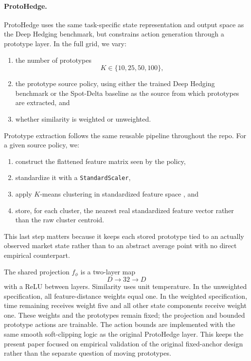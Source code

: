 \documentclass[sigconf]{acmart}
\begin{document}
\paragraph{ProtoHedge.}
ProtoHedge uses the same task-specific state representation and output space as
the Deep Hedging benchmark, but constrains action generation through a
prototype layer. In the full grid, we vary:
\begin{enumerate}
    \item the number of prototypes
    \[
    K \in \{10, 25, 50, 100\},
    \]
    \item the prototype source policy, using either the trained Deep Hedging
    benchmark or the Spot-Delta baseline as the source from which prototypes
    are extracted, and
    \item whether similarity is weighted or unweighted.
\end{enumerate}

Prototype extraction follows the same reusable pipeline throughout the repo. For a given source policy, we:
\begin{enumerate}
    \item construct the flattened feature matrix seen by the policy,
    \item standardize it with a \texttt{StandardScaler},
    \item apply $K$-means clustering in standardized feature space
    \cite{macqueen1967}, and
    \item store, for each cluster, the nearest real standardized feature vector rather than the raw cluster centroid.
\end{enumerate}
This last step matters because it keeps each stored prototype tied to an actually observed market state rather than to an abstract average point with no direct empirical counterpart.

The shared projection $f_\phi$ is a two-layer map
\[
D\longrightarrow 32\longrightarrow D
\]
with a ReLU between layers. Similarity uses unit temperature. In the
unweighted specification, all feature-distance weights equal one. In the
weighted specification, time remaining receives weight five and all other
state components receive weight one. These weights and the prototypes remain
fixed; the projection and bounded prototype actions are trainable. The action
bounds are implemented with the same smooth soft-clipping logic as the
original ProtoHedge layer. This keeps the present paper focused on empirical
validation of the original fixed-anchor design rather than the separate
question of moving prototypes.
\end{document}
